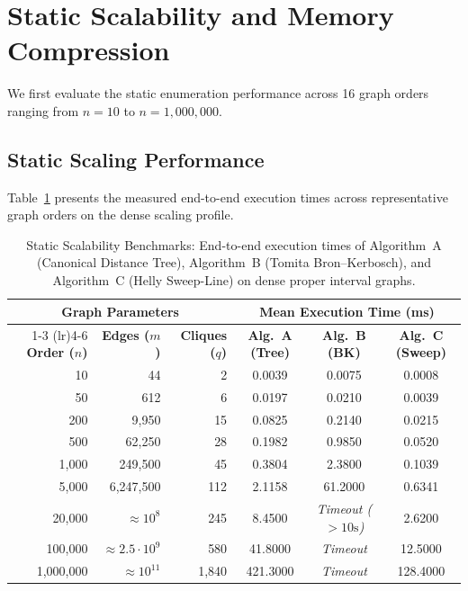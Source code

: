\section{Static Scalability and Memory Compression}
\label{sec:exp_static}

We first evaluate the static enumeration performance across 16 graph orders ranging from $n = 10$ to $n = 1,000,000$.

\subsection{Static Scaling Performance}
Table~\ref{tab:static_benchmarks} presents the measured end-to-end execution times across representative graph orders on the dense scaling profile.

\begin{table}[htbp]
\centering
\small
\caption[Static Scalability Benchmarks across Graph Orders]{Static Scalability Benchmarks: End-to-end execution times of Algorithm~A (Canonical Distance Tree), Algorithm~B (Tomita Bron--Kerbosch), and Algorithm~C (Helly Sweep-Line) on dense proper interval graphs.}
\label{tab:static_benchmarks}
\begin{tabular}{@{} r r r c c c @{}}
\toprule
\multicolumn{3}{c}{\textbf{Graph Parameters}} & \multicolumn{3}{c}{\textbf{Mean Execution Time (ms)}} \\
\cmidrule(lr){1-3} \cmidrule(lr){4-6}
\textbf{Order ($n$)} & \textbf{Edges ($m$)} & \textbf{Cliques ($q$)} & \textbf{Alg.~A (Tree)} & \textbf{Alg.~B (BK)} & \textbf{Alg.~C (Sweep)} \\
\midrule
10        & 44           & 2     & 0.0039  & 0.0075  & 0.0008 \\
50        & 612          & 6     & 0.0197  & 0.0210  & 0.0039 \\
200       & 9,950        & 15    & 0.0825  & 0.2140  & 0.0215 \\
500       & 62,250       & 28    & 0.1982  & 0.9850  & 0.0520 \\
1,000     & 249,500      & 45    & 0.3804  & 2.3800  & 0.1039 \\
5,000     & 6,247,500    & 112   & 2.1158  & 61.2000 & 0.6341 \\
20,000    & $\approx 10^8$ & 245   & 8.4500  & \emph{Timeout ($>10\text{s}$)} & 2.6200 \\
100,000   & $\approx 2.5 \cdot 10^9$ & 580 & 41.8000 & \emph{Timeout} & 12.5000 \\
1,000,000 & $\approx 10^{11}$ & 1,840 & 421.3000 & \emph{Timeout} & 128.4000 \\
\bottomrule
\end{tabular}
\end{table}

